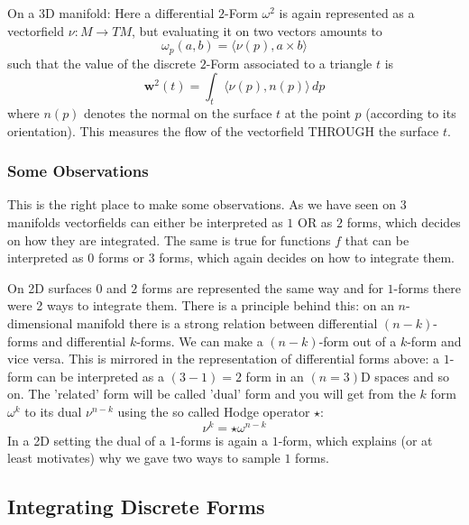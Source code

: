 On a 3D manifold: Here a differential $2$-Form $\omega^2$ is again represented as a vectorfield $\nu: M\to TM$, but evaluating it on two vectors amounts to
\[\omega_p(a,b) = \langle \nu(p) , a \times b \rangle\]
such that the value of the discrete $2$-Form associated to a triangle $t$ is
\[\textbf{w}^2(t)= \int_{t} \langle \nu(p), n(p) \rangle \, dp\]
where $n(p)$ denotes the normal on the surface $t$ at the point $p$ (according to its orientation). This measures the flow of the vectorfield THROUGH the surface $t$. 

\subsubsection{Some Observations}
 This is the right place to make some observations. As we have seen on 3 manifolds vectorfields can either be interpreted as $1$ OR as $2$ forms, which decides on how they are integrated. The same is true for functions $f$ that can be interpreted as $0$ forms or $3$ forms, which again decides on how to integrate them. 

On 2D surfaces $0$ and $2$ forms are represented the same way and for $1$-forms there were 2 ways to integrate them. There is a principle behind this: on an $n$-dimensional manifold there is a strong relation between differential $(n-k)$-forms and differential $k$-forms. We can make a $(n-k)$-form out of a $k$-form and vice versa. This is mirrored in the representation of differential forms above: a $1$-form can be interpreted as a $(3-1) =2$ form in an $(n =3)$D spaces and so on. The 'related' form will be called 'dual' form and you will get from the $k$ form $\omega^k$ to its dual $\nu^{n-k}$ using the so called Hodge operator $\star$:
\[\nu^{k} = \star \omega^{n-k}\]
In a 2D setting the dual of a $1$-forms is again a $1$-form, which explains (or at least motivates) why we gave two ways to sample $1$ forms.


\subsection{Integrating Discrete Forms}


